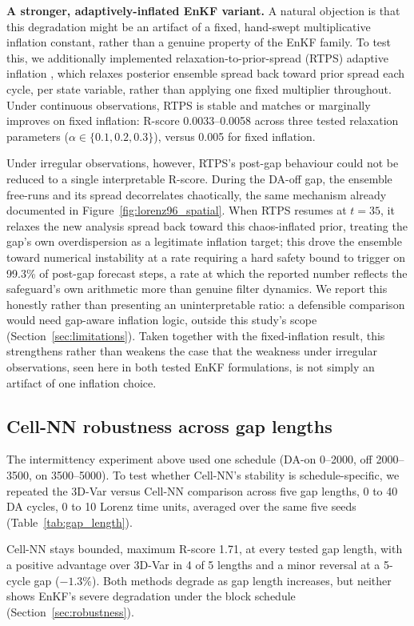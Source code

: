 \documentclass[final,5p,times,twocolumn,authoryear]{elsarticle}
\begin{document}
\textbf{A stronger, adaptively-inflated EnKF variant.} A natural
objection is that this degradation might be an artifact of a fixed,
hand-swept multiplicative inflation constant, rather than a genuine
property of the EnKF family. To test this, we additionally
implemented relaxation-to-prior-spread (RTPS) adaptive inflation
\citep{whitaker2012rtps}, which relaxes posterior ensemble spread
back toward prior spread each cycle, per state variable, rather than
applying one fixed multiplier throughout. Under continuous
observations, RTPS is stable and matches or marginally improves on
fixed inflation: R-score 0.0033--0.0058 across three tested
relaxation parameters ($\alpha \in \{0.1,0.2,0.3\}$), versus 0.005
for fixed inflation.

Under irregular observations, however, RTPS's post-gap behaviour
could not be reduced to a single interpretable R-score. During the
DA-off gap, the ensemble free-runs and its spread decorrelates
chaotically, the same mechanism already documented in
Figure~\ref{fig:lorenz96_spatial}. When RTPS resumes at $t=35$, it
relaxes the new analysis spread back toward this chaos-inflated
prior, treating the gap's own overdispersion as a legitimate
inflation target; this drove the ensemble toward numerical
instability at a rate requiring a hard safety bound to trigger on
99.3\% of post-gap forecast steps, a rate at which the reported
number reflects the safeguard's own arithmetic more than genuine
filter dynamics. We report this honestly rather than presenting an
uninterpretable ratio: a defensible comparison would need gap-aware
inflation logic, outside this study's scope
(Section~\ref{sec:limitations}). Taken together with the fixed-inflation
result, this strengthens rather than weakens the case that the
weakness under irregular observations, seen here in both tested EnKF
formulations, is not simply an artifact of one inflation choice.

\subsection{Cell-NN robustness across gap lengths}

The intermittency experiment above used one schedule (DA-on
0--2000, off 2000--3500, on 3500--5000). To test whether Cell-NN's
stability is schedule-specific, we repeated the 3D-Var versus
Cell-NN comparison across five gap lengths, 0 to 40 DA cycles, 0 to
10 Lorenz time units, averaged over the same five seeds
(Table~\ref{tab:gap_length}).

Cell-NN stays bounded, maximum R-score 1.71, at every tested gap
length, with a positive advantage over 3D-Var in 4 of 5 lengths and
a minor reversal at a 5-cycle gap ($-1.3\%$). Both methods degrade
as gap length increases, but neither shows EnKF's severe degradation
under the block schedule (Section~\ref{sec:robustness}).
\end{document}
